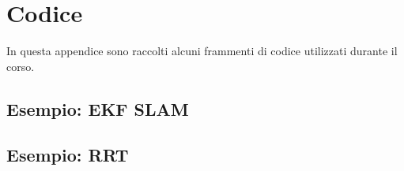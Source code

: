 \chapter{Codice}
\label{app:codice}

In questa appendice sono raccolti alcuni frammenti di codice utilizzati durante il corso.

\section{Esempio: EKF SLAM}


\section{Esempio: RRT}

